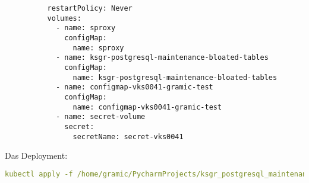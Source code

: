 \begin{flushleft}
\begin{lstlisting}
          restartPolicy: Never
          volumes:
            - name: sproxy
              configMap:
                name: sproxy
            - name: ksgr-postgresql-maintenance-bloated-tables
              configMap:
                name: ksgr-postgresql-maintenance-bloated-tables
            - name: configmap-vks0041-gramic-test
              configMap:
                name: configmap-vks0041-gramic-test
            - name: secret-volume
              secret:
                secretName: secret-vks0041
    \end{lstlisting}
    Das Deployment:
    \lstset{style=gra_codestyle}
    \begin{lstlisting}[language=yaml, caption=Maintenance-Tool - Bloated Tables / Indices - ksgr-maintenance-bloating-vks0041-gramic-test Deploy,captionpos=b,label={lst:maintenannce-tool-bloated-tables-ksgr-maintenance-bloating-vks0041-gramic-test-deploy},breaklines=true]
kubectl apply -f /home/gramic/PycharmProjects/ksgr_postgresql_maintenance/cleaned/ksgr-maintenance-bloating-vks0041-gramic_test-cronjob.yaml
    \end{lstlisting}
\end{flushleft}